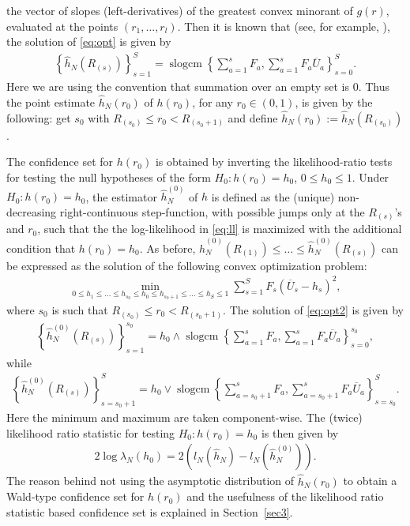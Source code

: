 \documentclass[12pt]{amsart}
\theoremstyle{plain}
\theoremstyle{remark}
\numberwithin{equation}{section}
\begin{document}
the vector of slopes (left-derivatives) of the greatest convex minorant of \(g(r)\), 
evaluated at the points \((r_1,\ldots,r_l)\). Then it is known that (see, for example, \cite{robertson1988order}), the solution of \eqref{eq:opt} is given by
\begin{align}\label{eq:hath}
    \left\{\hat{h}_N\left(R_{(s)}\right)\right\}_{s = 1}^{S} = \operatorname{slogcm}\left\{\sum_{a=1}^s{F}_a, \sum_{a=1}^s{F}_a\overline{U}_a\right\}_{s = 0}^{S}.
\end{align}
Here we are using the convention that summation over an empty set is $0$. Thus the point estimate $\hat{h}_N(r_0)$ of $h(r_0)$, for any $r_0 \in (0,1)$, is given by the following: get $s_0$ with ${R_{(s_0)} \leq r_0 < R_{(s_0+1)}}$ and define $\hat{h}_N\left(r_0\right) := \hat{h}_N\left(R_{(s_0)}\right)$.

The confidence set for \(h(r_0)\) is obtained by inverting the likelihood-ratio tests for testing the null hypotheses of the form ${H_0 : h(r_0) = h_0}$, $0 \leq h_0 \leq 1$. Under ${H_0 : h(r_0) = h_0}$, 
the estimator $\hat{h}^{(0)}_N$ of $h$ is defined as the (unique) non-decreasing right-continuous step-function, with possible jumps only at the $R_{(s)}$'s and $r_0$, such that the
the log-likelihood in \eqref{eq:ll} is maximized with the additional condition that $h(r_0) = h_0$. 
As before, 
\(\hat{h}^{(0)}_N\left(R_{(1)}\right) \leq \ldots \leq \hat{h}^{(0)}_N\left(R_{(s)}\right)\) can be expressed as the solution of the following convex optimization problem: 
\begin{align}\label{eq:opt2}
\min_{0 \leq h_1 \leq \ldots \leq h_{s_0} \leq h_0 \leq h_{s_0+1} \leq \ldots \leq h_S \leq 1}\sum_{s=1}^S {F}_s(\overline{U}_s - h_s)^2,
\end{align}
where $s_0$ is such that ${R_{(s_0)} \leq r_0 < R_{(s_0+1)}}$. 
The solution of \eqref{eq:opt2} is given by
\begin{align}\label{eq:hath01}
    \left\{\hat{h}^{(0)}_N\left(R_{(s)}\right)\right\}_{s = 1}^{s_0} = h_0 \wedge \operatorname{slogcm}\left\{\sum_{a=1}^s{F}_a, \sum_{a=1}^s{F}_a\overline{U}_a\right\}_{s = 0}^{s_0},
\end{align}
while
\begin{align}\label{eq:hath02}
    \left\{\hat{h}^{(0)}_N\left(R_{(s)}\right)\right\}_{s = s_0+1}^{S} = h_0 \vee \operatorname{slogcm}\left\{\sum_{a=s_0+1}^s{F}_a, \sum_{a=s_0+1}^s{F}_a\overline{U}_a\right\}_{s = s_0}^{S}.
\end{align}
Here the minimum and maximum are taken component-wise. The (twice) likelihood ratio statistic for testing ${H_0 : h(r_0) = h_0}$ is then given by
\begin{align*}
    2\log \lambda_N(h_0) = 2\left(l_N\left(\hat{h}_N\right) - l_N\left(\hat{h}^{(0)}_N\right)\right).
\end{align*}
The reason behind not using the asymptotic distribution of $\hat{h}_N(r_0)$ to obtain a Wald-type confidence set for $h(r_0)$ and the usefulness of the likelihood ratio statistic based confidence set is explained in Section~\ref{sec3}.
\end{document}
